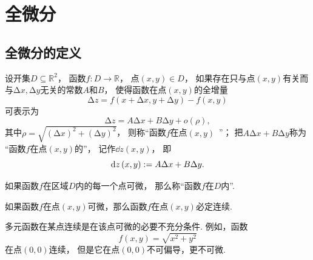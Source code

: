 \section{全微分}
\subsection{全微分的定义}
\begin{definition}
设开集\(D \subseteq \mathbb{R}^2\)，
函数\(f\colon D\to\mathbb{R}\)，
点\((x,y) \in D\)，
如果存在只与点\((x,y)\)有关而与\(\increment x,\increment y\)无关的常数\(A\)和\(B\)，
使得函数在点\((x,y)\)的全增量\begin{equation*}
	\increment z = f(x + \increment x,y + \increment y) - f(x,y)
\end{equation*}可表示为\begin{equation*}
	\increment z = A \increment x + B \increment y + o(\rho),
\end{equation*}
其中\(\rho=\sqrt{(\increment x)^2+(\increment y)^2}\)，
则称“函数\(f\)在点\((x,y)\)~”；
把\(A \increment x + B \increment y\)称为
“函数\(f\)在点\((x,y)\)的”，
记作\(\dd{z}(x,y)\)，
即\begin{equation*}
	\dd{z}(x,y)
	:=
	A \Delta x + B \Delta y.
\end{equation*}
\end{definition}
\begin{definition}
如果函数\(f\)在区域\(D\)内的每一个点可微，
那么称“函数\(f\)在\(D\)内”.
\end{definition}

\begin{theorem}[必要条件1]
如果函数\(f\)在点\((x,y)\)可微，那么函数\(f\)在点\((x,y)\)必定连续.
\end{theorem}
\begin{remark}
多元函数在某点连续是在该点可微的必要不充分条件.
例如，函数\begin{equation*}
	f(x,y) = \sqrt{x^2+y^2}
\end{equation*}在点\((0,0)\)连续，
但是它在点\((0,0)\)不可偏导，更不可微.
\end{remark}

